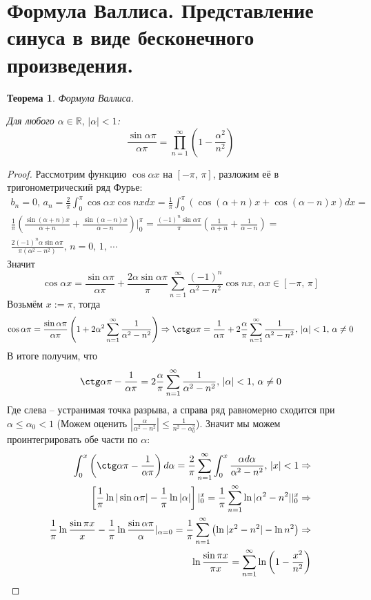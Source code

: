 \documentclass[a4paper,12pt]{article}
\renewcommand{\leq}{\ensuremath{\leqslant}}
\theoremstyle{plain}
\newtheorem{theorem}{Теорема}[section]
\theoremstyle{definition}
\theoremstyle{remark}
\begin{document}
\section{Формула Валлиса. Представление синуса в виде бесконечного произведения.}
\begin{theorem}
	Формула Валлиса.

	Для любого $\alpha \in \mathbb{R},\, |\alpha| < 1$:
	\[\frac{\sin \alpha\pi}{\alpha\pi} = \prod_{n = 1}^\infty \left(1 - \frac{\alpha^2}{n^2}\right)\]
\end{theorem}
\begin{proof}
	Рассмотрим функцию $\cos\alpha x$ на $[-\pi,\,\pi]$, разложим её в тригонометрический ряд Фурье:
	\begin{align*}
		b_n = 0,\, a_n = \frac{2}{\pi}\int_0^\pi\cos\alpha x\cos nxdx = \frac{1}{\pi}\int_0^\pi(\cos(\alpha + n)x + \cos(\alpha - n)x)dx =                                                                        \\
		\frac{1}{\pi}\left(\frac{\sin(\alpha + n)x}{\alpha + n} + \frac{\sin(\alpha - n)x}{\alpha - n}\right)|_0^\pi = \frac{(-1)^n\sin\alpha\pi}{\pi}\left(\frac{1}{\alpha + n} + \frac{1}{\alpha - n }\right) = \\
		\frac{2(-1)^n\alpha\sin\alpha\pi}{\pi(\alpha^2 - n^2)},\, n = 0,\,1,\,\cdots
	\end{align*}
	Значит
	\[\cos\alpha x = \frac{\sin\alpha\pi}{\alpha\pi} + \frac{2\alpha\sin\alpha\pi}{\pi}\sum_{n = 1}^\infty \frac{(-1)^n}{\alpha^2 - n^2}\cos nx,\, \alpha x \in [-\pi,\,\pi]\]
	Возьмём $x := \pi$, тогда
	\[\cos\alpha\pi = \frac{\sin\alpha\pi}{\alpha\pi}\left(1 + 2\alpha^2\sum_{n = 1}^\infty \frac{1}{\alpha^2 - n^2}\right) \Rightarrow \ctg\alpha\pi = \frac{1}{\alpha\pi} + 2\frac{\alpha}{\pi}\sum_{n=1}^\infty\frac{1}{\alpha^2 - n^2},\, |\alpha| < 1,\, \alpha \neq 0\]
	В итоге получим, что
	\[\ctg\alpha\pi  - \frac{1}{\alpha\pi} = 2\frac{\alpha}{\pi}\sum_{n=1}^\infty\frac{1}{\alpha^2 - n^2},\, |\alpha| < 1,\, \alpha \neq 0\]
	Где слева -- устранимая точка разрыва, а справа ряд равномерно сходится при $\alpha \leq \alpha_0 < 1$ (Можем оценить $\left|\frac{\alpha}{\alpha^2 - n^2}\right|\leq \frac{1}{n^2 - \alpha_0^2}$). Значит мы можем проинтегрировать обе части по $\alpha$:
	\begin{align*}
		\int_0^x \left(\ctg\alpha\pi  - \frac{1}{\alpha\pi}\right)d\alpha = \frac{2}{\pi}\sum_{n = 1}^\infty \int_0^x \frac{\alpha d\alpha}{\alpha^2 - n^2},\, |x| < 1 \Rightarrow           \\
		\left[\frac{1}{\pi}\ln|\sin\alpha\pi| - \frac{1}{\pi}\ln|\alpha|\right]|_0^x = \frac{1}{\pi}\sum_{n = 1}^\infty\ln|\alpha^2 - n^2||_0^x \Rightarrow                                  \\
		\frac{1}{\pi}\ln\frac{\sin\pi x}{x} - \frac{1}{\pi}\ln\frac{\sin\alpha\pi}{\alpha}|_{\alpha = 0} = \frac{1}{\pi}\sum_{n = 1}^\infty\left(\ln|x^2 - n^2| - \ln n^2\right) \Rightarrow \\
		\ln\frac{\sin\pi x}{\pi x} = \sum_{n = 1}^\infty \ln\left(1 - \frac{x^2}{n^2}\right)
	\end{align*}
\end{proof}
\end{document}
